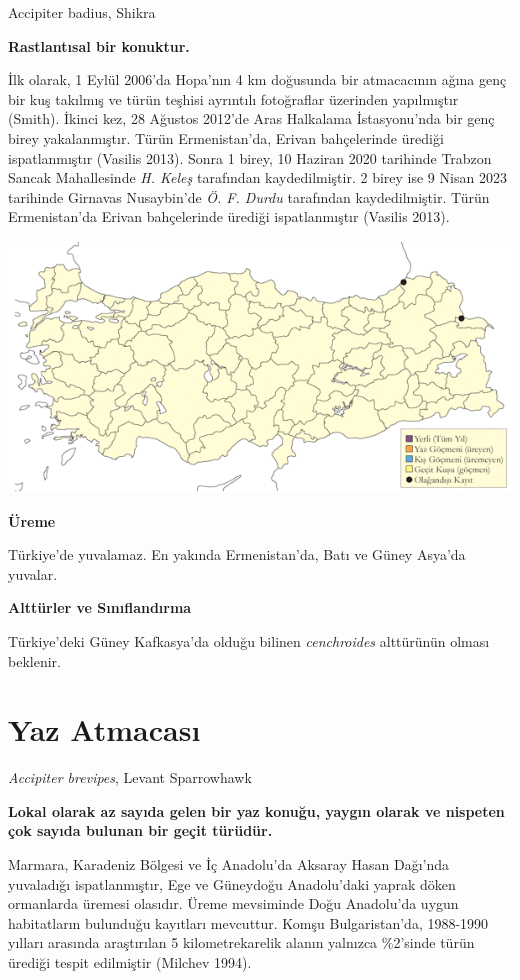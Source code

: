 \documentclass[
  letterpaper,
  DIV=11,
  numbers=noendperiod]{scrreprt}
\begin{document}
Accipiter badius, Shikra

\textbf{Rastlantısal bir konuktur.}

İlk olarak, 1 Eylül 2006'da Hopa'nın 4 km doğusunda bir atmacacının
ağına genç bir kuş takılmış ve türün teşhisi ayrıntılı fotoğraflar
üzerinden yapılmıştır (Smith). İkinci kez, 28 Ağustos 2012'de Aras
Halkalama İstasyonu'nda bir genç birey yakalanmıştır. Türün
Ermenistan'da, Erivan bahçelerinde ürediği ispatlanmıştır (Vasilis
2013). Sonra 1 birey, 10 Haziran 2020 tarihinde Trabzon Sancak
Mahallesinde \emph{H. Keleş} tarafından kaydedilmiştir. 2 birey ise 9
Nisan 2023 tarihinde Girnavas Nusaybin'de \emph{Ö. F. Durdu} tarafından
kaydedilmiştir. Türün Ermenistan'da Erivan bahçelerinde ürediği
ispatlanmıştır (Vasilis 2013).

\includegraphics{images/harita_Page_098.png}

\textbf{Üreme}

Türkiye'de yuvalamaz. En yakında Ermenistan'da, Batı ve Güney Asya'da
yuvalar.

\textbf{Alttürler ve Sınıflandırma}

Türkiye'deki Güney Kafkasya'da olduğu bilinen \emph{cenchroides}
alttürünün olması beklenir.

\section{Yaz Atmacası}\label{yaz-atmacasux131}

\emph{Accipiter brevipes}, Levant Sparrowhawk

\textbf{Lokal olarak az sayıda gelen bir yaz konuğu, yaygın olarak ve
nispeten çok sayıda bulunan bir geçit türüdür.}

Marmara, Karadeniz Bölgesi ve İç Anadolu'da Aksaray Hasan Dağı'nda
yuvaladığı ispatlanmıştır, Ege ve Güneydoğu Anadolu'daki yaprak döken
ormanlarda üremesi olasıdır. Üreme mevsiminde Doğu Anadolu'da uygun
habitatların bulunduğu kayıtları mevcuttur. Komşu Bulgaristan'da,
1988-1990 yılları arasında araştırılan 5 kilometrekarelik alanın
yalnızca \%2'sinde türün ürediği tespit edilmiştir (Milchev 1994).
\end{document}

